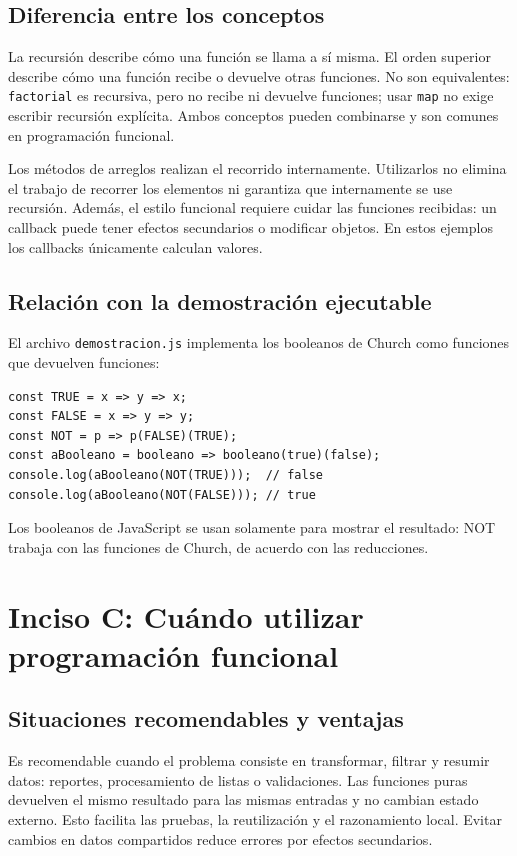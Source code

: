 \documentclass[11pt,a4paper]{article}
\begin{document}
\subsection{Diferencia entre los conceptos}
La recursión describe cómo una función se llama a sí misma. El orden superior
describe cómo una función recibe o devuelve otras funciones. No son
equivalentes: \texttt{factorial} es recursiva, pero no recibe ni devuelve
funciones; usar \texttt{map} no exige escribir recursión explícita. Ambos
conceptos pueden combinarse y son comunes en programación funcional.

Los métodos de arreglos realizan el recorrido internamente. Utilizarlos no
elimina el trabajo de recorrer los elementos ni garantiza que internamente
se use recursión. Además, el estilo funcional requiere cuidar las funciones
recibidas: un callback puede tener efectos secundarios o modificar objetos.
En estos ejemplos los callbacks únicamente calculan valores.

\subsection{Relación con la demostración ejecutable}
El archivo \texttt{demostracion.js} implementa los booleanos de Church como
funciones que devuelven funciones:
\begin{lstlisting}
const TRUE = x => y => x;
const FALSE = x => y => y;
const NOT = p => p(FALSE)(TRUE);
const aBooleano = booleano => booleano(true)(false);
console.log(aBooleano(NOT(TRUE)));  // false
console.log(aBooleano(NOT(FALSE))); // true
\end{lstlisting}
Los booleanos de JavaScript se usan solamente para mostrar el resultado:
NOT trabaja con las funciones de Church, de acuerdo con las reducciones.

\newpage
\section{Inciso C: Cuándo utilizar programación funcional}
\subsection{Situaciones recomendables y ventajas}
Es recomendable cuando el problema consiste en transformar, filtrar y resumir
datos: reportes, procesamiento de listas o validaciones. Las funciones puras
devuelven el mismo resultado para las mismas entradas y no cambian estado
externo. Esto facilita las pruebas, la reutilización y el razonamiento local.
Evitar cambios en datos compartidos reduce errores por efectos secundarios.
\end{document}
